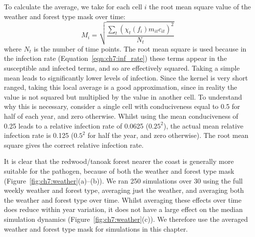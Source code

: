 To calculate the average, we take for each cell $i$ the root mean square value of the weather and forest type mask over time:
\begin{equation}
    M_i = \sqrt{\frac{\sum_t\left(\chi_t(f_i)m_{it}c_{it}\right)^2}{N_t}}
\end{equation}
where $N_t$ is the number of time points. The root mean square is used because in the infection rate (Equation~\ref{eqn:ch7:inf_rate}) these terms appear in the susceptible and infected terms, and so are effectively squared. Taking a simple mean leads to significantly lower levels of infection. Since the kernel is very short ranged, taking this local average is a good approximation, since in reality the value is not squared but multiplied by the value in another cell. To understand why this is necessary, consider a single cell with conduciveness equal to 0.5 for half of each year, and zero otherwise. Whilst using the mean conduciveness of 0.25 leads to a relative infection rate of 0.0625 ($0.25^2$), the actual mean relative infection rate is 0.125 ($0.5^2$ for half the year, and zero otherwise). The root mean square gives the correct relative infection rate.

It is clear that the redwood/tanoak forest nearer the coast is generally more suitable for the pathogen, because of both the weather and forest type mask (Figure~\ref{fig:ch7:weather}(a)--(b)). We ran 250 simulations over \SI{30}{\years} using the full weekly weather and forest type, averaging just the weather, and averaging both the weather and forest type over time. Whilst averaging these effects over time does reduce within year variation, it does not have a large effect on the median simulation dynamics (Figure~\ref{fig:ch7:weather}(c)). We therefore use the averaged weather and forest type mask for simulations in this chapter.

